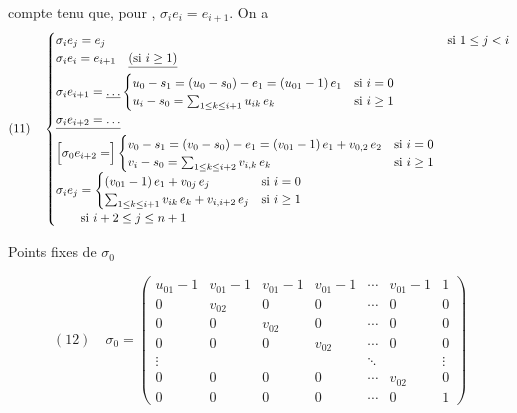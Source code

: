 \documentclass[11pt,a4paper]{article}
\begin{document}
compte tenu que, pour , $\sigma_i e_i = e_{i+1}$. On a 
\[
(11)\quad
\begin{cases}
\sigma_i e_j = e_j & \text{si } 1\le j< i\\
\sigma_i e_i = e_{i+1} \quad \struck{(\text{si } i\ge 1)} & \\
\sigma_i e_{i+1} = \struck{\ldots}
  \begin{cases} u_0 - s_1 = (u_0-s_0) - e_1 = (u_{01}-1)\,e_1 & \text{si } i=0\\
  u_i - s_0 = \sum_{1\le k\le i+1} u_{ik}\, e_k & \text{si } i\ge 1\end{cases}\\
\struck{\sigma_i e_{i+2} = \ldots}\\
\Bigl[\sigma_0 e_{i+2} = \Bigr]
  \begin{cases} v_0 - s_1 = (v_0-s_0) - e_1 = (v_{01}-1)\,e_1 + v_{0,2}\, e_2 & \text{si } i=0\\
  v_i - s_0 = \sum_{1\le k\le i+2} v_{i,k}\, e_k & \text{si } i\ge 1\end{cases}\\
\sigma_i e_j = \begin{cases} (v_{01}-1)\,e_1 + v_{0j}\, e_j & \text{si } i=0\\
  \sum_{1\le k\le i+1} v_{ik}\, e_k + v_{i,i+2}\, e_j & \text{si } i\ge 1\end{cases}\\
\qquad \text{si } i+2\le j\le n+1
\end{cases}
\]


Points fixes de $\sigma_0$

\[
(12)\quad \sigma_0 =
\begin{pmatrix}
u_{01}-1 & v_{01}-1 & v_{01}-1 & v_{01}-1 & \cdots & v_{01}-1 & 1\\
0 & v_{02} & 0 & 0 & \cdots & 0 & 0\\
0 & 0 & v_{02} & 0 & \cdots & 0 & 0\\
0 & 0 & 0 & v_{02} & \cdots & 0 & 0\\
\vdots & & & & \ddots & & \vdots\\
0 & 0 & 0 & 0 & \cdots & v_{02} & 0\\
0 & 0 & 0 & 0 & \cdots & 0 & 1
\end{pmatrix}
\]
\end{document}
